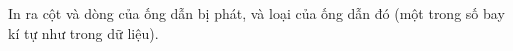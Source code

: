 In ra cột và dòng của ống dẫn bị phát, và loại của ống dẫn đó (một trong số bay kí tự như trong dữ liệu).  

\